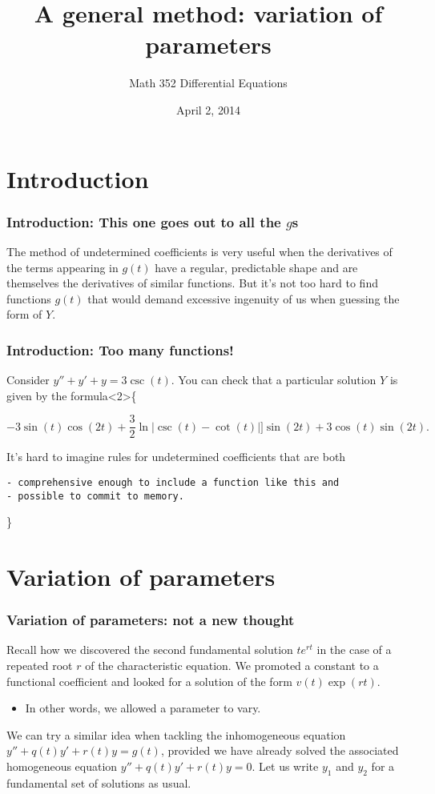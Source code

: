 \documentclass[11pt,ignorenonframetext,]{beamer}
\title{A general method: variation of parameters}
\author{Math 352 Differential Equations}
\date{April 2, 2014}
\begin{document}
\frame{\titlepage}

\section{Introduction}

\begin{frame}\frametitle{Introduction: This one goes out to all the
$g$s}

The method of undetermined coefficients is very useful when the
derivatives of the terms appearing in $g(t)$ have a regular, predictable
shape and are themselves the derivatives of similar functions. But it's
not too hard to find functions $g(t)$ that would demand excessive
ingenuity of us when guessing the form of $Y$.

\end{frame}

\begin{frame}[fragile]\frametitle{Introduction: Too many functions!}

Consider $y'' + y' + y = 3 \csc{(t)}$. You can check that a particular
solution $Y$ is given by the formula\only\textless{}2\textgreater{}\{

\begin{equation*}
        -3 \sin{(t)} \cos{(2t)} + \frac{3}{2} \ln |\csc{(t)} - \cot{(t)}| ]
        \sin{(2t)} + 3 \cos{(t)} \sin{(2t)}.
    \end{equation*}

It's hard to imagine rules for undetermined coefficients that are both

\begin{verbatim}
- comprehensive enough to include a function like this and
- possible to commit to memory.
\end{verbatim}

\}

\end{frame}

\section{Variation of parameters}

\begin{frame}\frametitle{Variation of parameters: not a new thought}

Recall how we discovered the second fundamental solution $t e^{rt}$ in
the case of a repeated root $r$ of the characteristic equation. We
promoted a constant to a functional coefficient and looked for a
solution of the form $v(t) \exp{(rt)}$.

\begin{itemize}
\itemsep1pt\parskip0pt
\item
  In other words, we allowed a parameter to vary.
\end{itemize}

We can try a similar idea when tackling the inhomogeneous equation
$y'' + q(t)y' + r(t)y = g(t)$, provided we have already solved the
associated homogeneous equation $y'' + q(t)y' + r(t)y = 0$. Let us write
$y_1$ and $y_2$ for a fundamental set of solutions as usual.

\end{frame}
\end{document}
